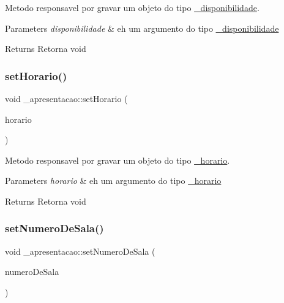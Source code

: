 Metodo responsavel por gravar um objeto do tipo \mbox{\hyperlink{class__disponibilidade}{\+\_\+disponibilidade}}. 


\begin{DoxyParams}{Parameters}
{\em disponibilidade} & eh um argumento do tipo \mbox{\hyperlink{class__disponibilidade}{\+\_\+disponibilidade}} \\
\hline
\end{DoxyParams}
\begin{DoxyReturn}{Returns}
Retorna void 
\end{DoxyReturn}
\mbox{\label{class__apresentacao_a8d87172bb584afb7eba9143d6b7a1f35}} 
\subsubsection{\texorpdfstring{setHorario()}{setHorario()}}
{\footnotesize\ttfamily void \+\_\+apresentacao\+::set\+Horario (\begin{DoxyParamCaption}\item[{const \mbox{\hyperlink{class__horario}{\+\_\+horario}} \&}]{horario }\end{DoxyParamCaption})}



Metodo responsavel por gravar um objeto do tipo \mbox{\hyperlink{class__horario}{\+\_\+horario}}. 


\begin{DoxyParams}{Parameters}
{\em horario} & eh um argumento do tipo \mbox{\hyperlink{class__horario}{\+\_\+horario}} \\
\hline
\end{DoxyParams}
\begin{DoxyReturn}{Returns}
Retorna void 
\end{DoxyReturn}
\mbox{\label{class__apresentacao_af15b6f040caeba269c4f040dc28ce316}} 
\subsubsection{\texorpdfstring{setNumeroDeSala()}{setNumeroDeSala()}}
{\footnotesize\ttfamily void \+\_\+apresentacao\+::set\+Numero\+De\+Sala (\begin{DoxyParamCaption}\item[{const \mbox{\hyperlink{class__numero_de_sala}{\+\_\+numero\+De\+Sala}} \&}]{numero\+De\+Sala }\end{DoxyParamCaption})}



